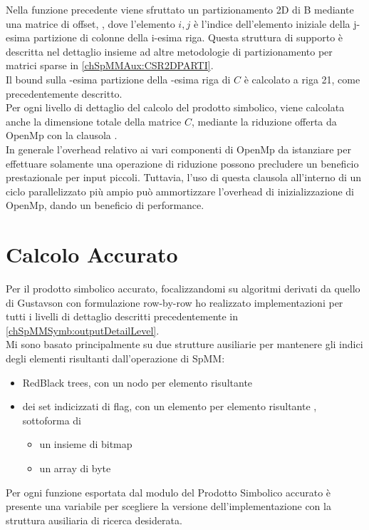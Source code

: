 Nella funzione precedente viene sfruttato un partizionamento 2D di B mediante una matrice di offset, ,
dove l'elemento $i,j$ è l'indice dell'elemento \nnz iniziale della 
j-esima partizione di colonne della i-esima riga.
Questa struttura di supporto è descritta nel dettaglio insieme ad altre metodologie di partizionamento 
per matrici sparse in \ref{chSpMMAux:CSR2DPARTI}.\\
Il bound sulla -esima partizione della -esima riga di $C$ 
è calcolato a riga 21, come precedentemente descritto.\\ 
\label{chSpMMSymb:OMPSetupCosts}
Per ogni livello di dettaglio del calcolo del prodotto simbolico, viene calcolata anche la dimensione
totale della matrice $C$, mediante la riduzione offerta da OpenMp con la clausola .\\
In generale l'overhead relativo ai vari componenti di OpenMp da istanziare per effettuare solamente
una operazione di riduzione possono precludere un beneficio prestazionale per input piccoli.
Tuttavia, l'uso di questa clausola all'interno di un ciclo parallelizzato più ampio può ammortizzare
l'overhead di inizializzazione di OpenMp, dando un beneficio di performance.\\


\section{Calcolo Accurato}
Per il prodotto simbolico accurato, focalizzandomi su algoritmi derivati 
da quello di Gustavson \cite{gustavson} con formulazione row-by-row 
ho realizzato implementazioni per tutti i livelli di dettaglio descritti precedentemente in \ref{chSpMMSymb:outputDetailLevel}.\\
Mi sono basato principalmente su due strutture ausiliarie per mantenere 
gli indici degli elementi \nnz risultanti dall'operazione di SpMM:\\
\begin{itemize}
	\item RedBlack trees, con un nodo per elemento risultante \nnz 
	\item dei set indicizzati di flag, con un elemento  per elemento risultante \nnz, 
	sottoforma di
	\begin{itemize}
		\item un insieme di bitmap 
		\item un array di byte
	\end{itemize}
\end{itemize}
Per ogni funzione esportata dal modulo del Prodotto Simbolico accurato è presente una variabile 
per scegliere la versione dell'implementazione con la struttura ausiliaria di ricerca desiderata.\\

